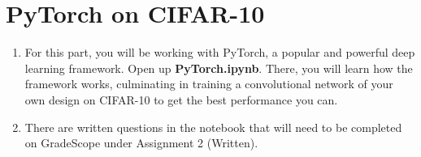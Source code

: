 \section{PyTorch on CIFAR-10}

\begin{enumerate}
    \item {} For this part, you will be working with PyTorch, a popular and powerful deep learning framework. Open up \textbf{PyTorch.ipynb}. There, you will learn how the framework works, culminating in training a convolutional network of your own design on CIFAR-10 to get the best performance you can.
    \item {} There are written questions in the notebook that will need to be completed on GradeScope under Assignment 2 (Written).
\end{enumerate}